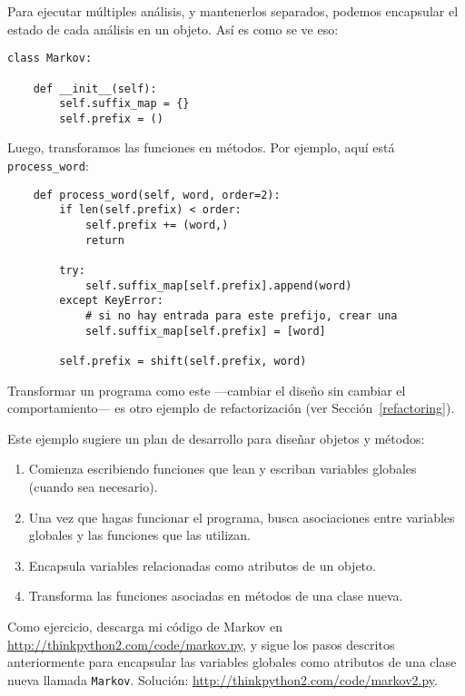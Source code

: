 \documentclass[10pt]{book}
\begin{document}
Para ejecutar múltiples análisis, y mantenerlos separados, podemos encapsular
el estado de cada análisis en un objeto.
Así es como se ve eso:

\begin{verbatim}
class Markov:

    def __init__(self):
        self.suffix_map = {}
        self.prefix = ()
\end{verbatim}

Luego, transforamos las funciones en métodos.  Por ejemplo,
aquí está \verb"process_word":

\begin{verbatim}
    def process_word(self, word, order=2):
        if len(self.prefix) < order:
            self.prefix += (word,)
            return

        try:
            self.suffix_map[self.prefix].append(word)
        except KeyError:
            # si no hay entrada para este prefijo, crear una
            self.suffix_map[self.prefix] = [word]

        self.prefix = shift(self.prefix, word)
\end{verbatim}

Transformar un programa como este ---cambiar el diseño sin
cambiar el comportamiento--- es otro ejemplo de refactorización
(ver Sección~\ref{refactoring}).

Este ejemplo sugiere un plan de desarrollo para diseñar objetos y
métodos:

\begin{enumerate}

\item Comienza escribiendo funciones que lean y escriban variables
globales (cuando sea necesario).

\item Una vez que hagas funcionar el programa, busca asociaciones
entre variables globales y las funciones que las utilizan.

\item Encapsula variables relacionadas como atributos de un objeto.

\item Transforma las funciones asociadas en métodos de una clase
nueva.

\end{enumerate}

Como ejercicio, descarga mi código de Markov en
\url{http://thinkpython2.com/code/markov.py}, y sigue los pasos
descritos anteriormente para encapsular las variables globales como atributos de una clase
nueva llamada {\tt Markov}.  Solución:
\url{http://thinkpython2.com/code/markov2.py}.
\end{document}
